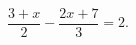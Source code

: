 \begin{ex}[type=equation]
	\begin{condition}
		$\dfrac{3+x}{2}-\dfrac{2x+7}{3}=2.$
	\end{condition}
\end{ex}
